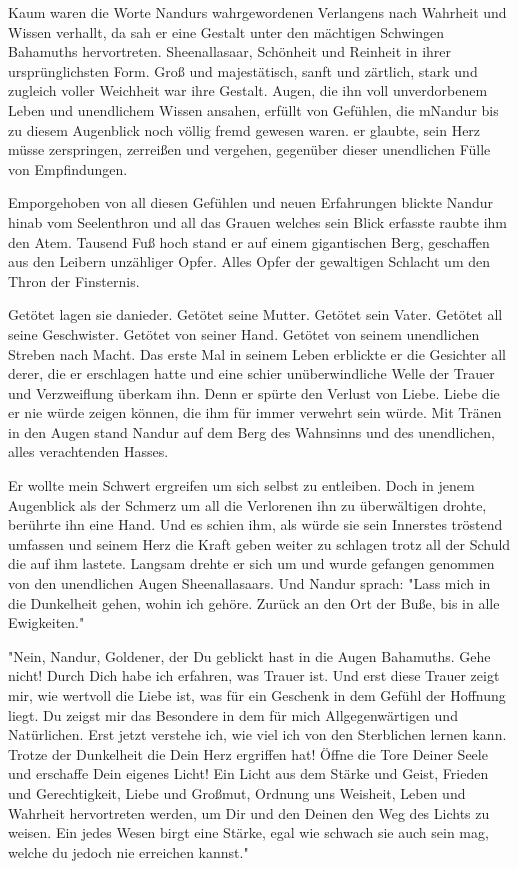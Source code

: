\documentclass[14pt,twoside,BCOR=12mm,DIV=classic]{scrbook}
\begin{document}
Kaum waren die Worte Nandurs wahrgewordenen Verlangens nach Wahrheit und Wissen
verhallt, da sah er eine Gestalt unter den mächtigen Schwingen Bahamuths
hervortreten. Sheenallasaar, Schönheit und Reinheit in ihrer ursprünglichsten
Form. Groß und majestätisch, sanft und zärtlich, stark und zugleich voller
Weichheit war ihre Gestalt. Augen, die ihn voll unverdorbenem Leben und
unendlichem Wissen ansahen, erfüllt von Gefühlen, die mNandur bis zu diesem
Augenblick noch völlig fremd gewesen waren. er glaubte, sein Herz müsse
zerspringen, zerreißen und vergehen, gegenüber dieser unendlichen Fülle von
Empfindungen.

Emporgehoben von all diesen Gefühlen und neuen Erfahrungen blickte Nandur hinab
vom Seelenthron und all das Grauen welches sein Blick erfasste raubte ihm den
Atem. Tausend Fuß hoch stand er auf einem gigantischen Berg, geschaffen aus den
Leibern unzähliger Opfer. Alles Opfer der gewaltigen Schlacht um den Thron der
Finsternis.

Getötet lagen sie danieder. Getötet seine Mutter. Getötet sein Vater. Getötet
all seine Geschwister. Getötet von seiner Hand. Getötet von seinem unendlichen
Streben nach Macht.
Das erste Mal in seinem Leben erblickte er die Gesichter all derer, die er
erschlagen hatte und eine schier unüberwindliche Welle der Trauer und
Verzweiflung überkam ihn. Denn er spürte den Verlust von Liebe. Liebe die er nie
würde zeigen können, die ihm für immer verwehrt sein würde.
Mit Tränen in den Augen stand Nandur auf dem Berg des Wahnsinns und des
unendlichen, alles verachtenden Hasses.

Er wollte mein Schwert ergreifen um sich selbst zu entleiben. Doch in jenem
Augenblick als der Schmerz um all die Verlorenen ihn zu überwältigen drohte,
berührte ihn eine Hand. Und es schien ihm, als würde sie sein Innerstes tröstend
umfassen und seinem Herz die Kraft geben weiter zu schlagen trotz all der Schuld
die auf ihm lastete. Langsam drehte er sich um und wurde gefangen genommen von
den unendlichen Augen Sheenallasaars. Und Nandur sprach: "Lass mich in die
Dunkelheit gehen, wohin ich gehöre. Zurück an den Ort der Buße, bis in alle
Ewigkeiten."

"Nein, Nandur, Goldener, der Du geblickt hast in die Augen Bahamuths. Gehe
nicht! Durch Dich habe ich erfahren, was Trauer ist. Und erst diese Trauer zeigt
mir, wie wertvoll die Liebe ist, was für ein Geschenk in dem Gefühl der Hoffnung
liegt. Du zeigst mir das Besondere in dem für mich Allgegenwärtigen und
Natürlichen. Erst jetzt verstehe ich, wie viel ich von den Sterblichen lernen
kann. Trotze der Dunkelheit die Dein Herz ergriffen hat! Öffne die Tore Deiner
Seele und erschaffe Dein eigenes Licht! Ein Licht aus dem Stärke und Geist,
Frieden und Gerechtigkeit, Liebe und Großmut, Ordnung uns Weisheit, Leben und
Wahrheit hervortreten werden, um Dir und den Deinen den Weg des Lichts zu
weisen. Ein jedes Wesen birgt eine Stärke, egal wie schwach sie auch sein mag,
welche du jedoch nie erreichen kannst."
\end{document}
